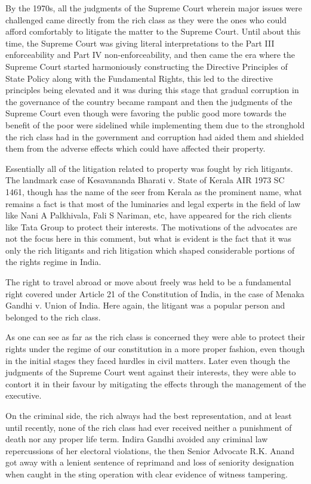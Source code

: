 \begin{multicols}{2}
\noi
By the 1970s, all the judgments of the Supreme Court wherein major issues were challenged came directly from the rich class as they were the ones who could afford comfortably to litigate the matter to the Supreme Court. Until about this time, the Supreme Court was giving literal interpretations to the Part III enforceability and Part IV non-enforceability, and then came the era where the Supreme Court started harmoniously constructing the Directive Principles of State Policy along with the Fundamental Rights, this led to the directive principles being elevated and it was during this stage that gradual corruption in the governance of the country became rampant and then the judgments of the Supreme Court even though were favoring the public good more towards the benefit of the poor were sidelined while implementing them due to the stronghold the rich class had in the government and corruption had aided them and shielded them from the adverse effects which could have affected their property.

\noi
Essentially all of the litigation related to property was fought by rich litigants. The landmark case of Kesavananda Bharati v. State of Kerala AIR 1973 SC 1461, though has the name of the seer from Kerala as the prominent name, what remains a fact is that most of the luminaries and legal experts in the field of law like Nani A Palkhivala, Fali S Nariman, etc, have appeared for the rich clients like Tata Group to protect their interests. The motivations of the advocates are not the focus here in this comment, but what is evident is the fact that it was only the rich litigants and rich litigation which shaped considerable portions of the rights regime in India.

\noi
The right to travel abroad or move about freely was held to be a fundamental right covered under Article 21 of the Constitution of India, in the case of Menaka Gandhi v. Union of India. Here again, the litigant was a popular person and belonged to the rich class.

\noi
As one can see as far as the rich class is concerned they were able to protect their rights under the regime of our constitution in a more proper fashion, even though in the initial stages they faced hurdles in civil matters. Later even though the judgments of the Supreme Court went against their interests, they were able to contort it in their favour by mitigating the effects through the management of the executive.

\noi
On the criminal side, the rich always had the best representation, and at least until recently, none of the rich class had ever received neither a punishment of death nor any proper life term. Indira Gandhi avoided any criminal law repercussions of her electoral violations, the then Senior Advocate R.K. Anand got away with a lenient sentence of reprimand and loss of seniority designation when caught in the sting operation with clear evidence of witness tampering.


\end{multicols}
